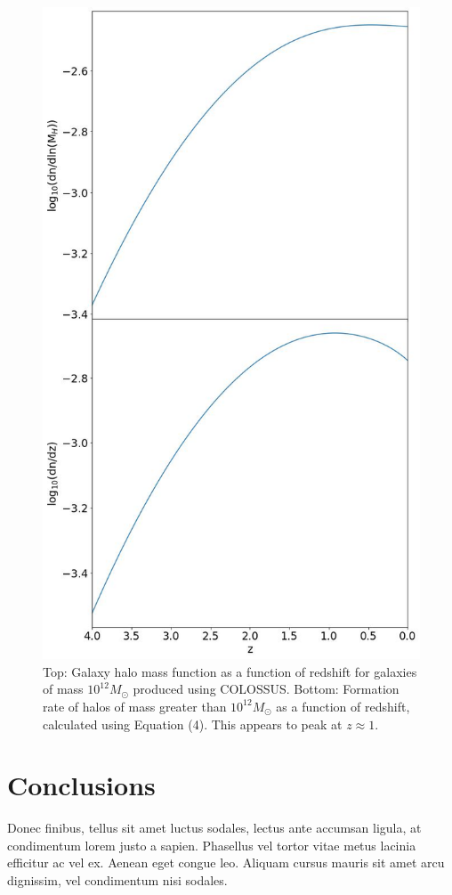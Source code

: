 \documentclass[12pt, twocolumn]{revtex4}    %
\begin{document}
\begin{figure}[H]
\centering
\includegraphics[width=13cm]{Plot_6.jpeg}
\caption{Top: Galaxy halo mass function as a function of redshift for galaxies of mass $10^{12}M_\odot$ produced using COLOSSUS. Bottom: Formation rate of halos of mass greater than $10^{12}M_\odot$ as a function of redshift, calculated using Equation (4). This appears to peak at $z\approx1$.}
\label{fig:6}
\end{figure}
\twocolumngrid
 

\section{Conclusions}
Donec finibus, tellus sit amet luctus sodales, lectus ante accumsan ligula, at condimentum lorem justo a sapien. Phasellus vel tortor vitae metus lacinia efficitur ac vel ex. Aenean eget congue leo. Aliquam cursus mauris sit amet arcu dignissim, vel condimentum nisi sodales. 



\end{document}
